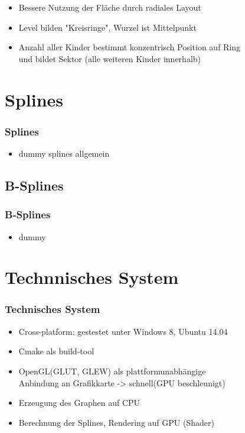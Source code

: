 \documentclass[11pt]{beamer}
\begin{document}
\begin{frame}
\begin{frame}
\begin{itemize}
\item Bessere Nutzung der Fläche durch radiales Layout
\item Level bilden "Kreisringe", Wurzel ist Mittelpunkt
\item Anzahl aller Kinder bestimmt konzentrisch Position auf Ring 
\\ und bildet Sektor (alle weiteren Kinder innerhalb)
\end{itemize}


\end{frame}


\section{Splines}
\begin{frame}
\frametitle{Splines}

\begin{itemize}
\item dummy splines allgemein
\end{itemize}

\end{frame}



\subsection{B-Splines}
\begin{frame}
\frametitle{B-Splines}

\begin{itemize}
\item dummy
\end{itemize}

\end{frame}



\section{Technnisches System}
\begin{frame}
\frametitle{Technisches System}

\begin{itemize}
\item Cross-platform: gestestet unter Windows 8, Ubuntu 14.04
\item Cmake als build-tool
\item OpenGL(GLUT, GLEW) als plattformunabhängige  
\\ Anbindung an Grafikkarte -> schnell(GPU beschleunigt) 
\item Erzeugung des Graphen auf CPU
\item Berechnung der Splines, Rendering auf GPU (Shader)
\end{itemize}


\end{frame}
\end{frame}
\end{document}
